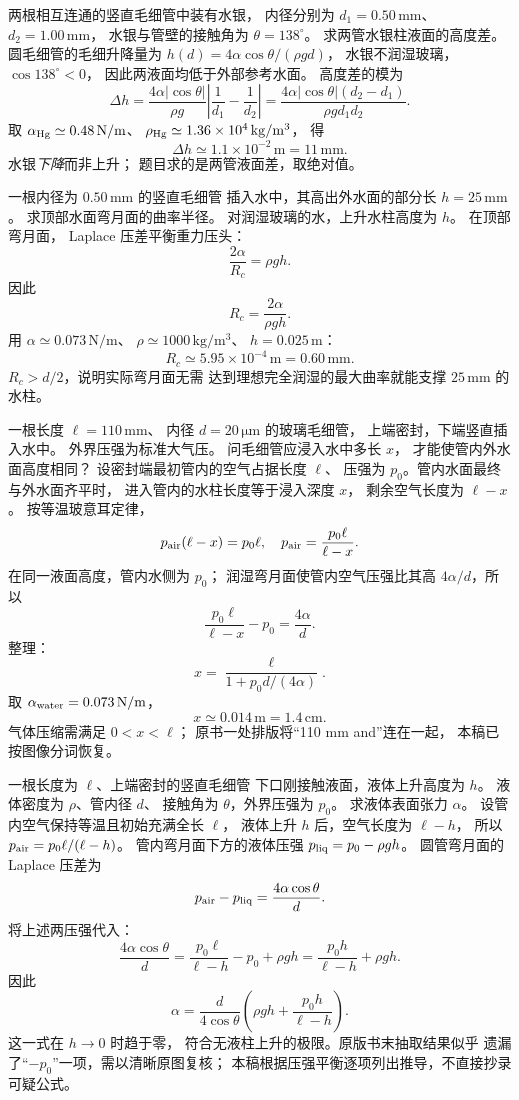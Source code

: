 两根相互连通的竖直毛细管中装有水银，
内径分别为
$d_1=0.50\,\mathrm{mm}$、
$d_2=1.00\,\mathrm{mm}$，
水银与管壁的接触角为
$\theta=138^\circ$。
求两管水银柱液面的高度差。
\exsolution
圆毛细管的毛细升降量为
$h(d)=4\alpha\cos\theta/(\rho gd)$，
水银不润湿玻璃，$\cos138^\circ<0$，
因此两液面均低于外部参考水面。
高度差的模为
\[
\boxed{\Delta h=
\frac{4\alpha|\cos\theta|}{\rho g}
\left|\frac1{d_1}-\frac1{d_2}\right|
=\frac{4\alpha|\cos\theta|(d_2-d_1)}
{\rho gd_1d_2}}.
\]
取 $\alpha_{\rm Hg}\simeq0.48\,\mathrm{N/m}$、
$\rho_{\rm Hg}\simeq1.36\times10^4\,\mathrm{kg/m^3}$，
得
\[
\boxed{\Delta h\simeq1.1\times10^{-2}\,\mathrm m
=11\,\mathrm{mm}}.
\]
\excheck 水银\emph{下降}而非上升；
题目求的是两管液面差，取绝对值。

一根内径为 $0.50\,\mathrm{mm}$ 的竖直毛细管
插入水中，其高出外水面的部分长
$h=25\,\mathrm{mm}$。
求顶部水面弯月面的曲率半径。
\exsolution
对润湿玻璃的水，上升水柱高度为 $h$。
在顶部弯月面，
Laplace 压差平衡重力压头：
\[
\frac{2\alpha}{R_c}=\rho gh.
\]
因此
\[
\boxed{R_c=\frac{2\alpha}{\rho gh}}.
\]
用 $\alpha\simeq0.073\,\mathrm{N/m}$、
$\rho\simeq1000\,\mathrm{kg/m^3}$、
$h=0.025\,\mathrm m$：
\[
\boxed{R_c\simeq5.95\times10^{-4}\,\mathrm m
=0.60\,\mathrm{mm}}.
\]
\excheck $R_c>d/2$，说明实际弯月面无需
达到理想完全润湿的最大曲率就能支撑
$25\,\mathrm{mm}$ 的水柱。

一根长度 $\ell=110\,\mathrm{mm}$、
内径 $d=20\,\mathrm{\mu m}$ 的玻璃毛细管，
上端密封，下端竖直插入水中。
外界压强为标准大气压。
问毛细管应浸入水中多长 $x$，
才能使管内外水面高度相同？
\exsolution
设密封端最初管内的空气占据长度 $\ell$、
压强为 $p_0$。管内水面最终与外水面齐平时，
进入管内的水柱长度等于浸入深度 $x$，
剩余空气长度为 $\ell-x$。
按等温玻意耳定律，
\[
p_{\rm air}(\ell-x)=p_0\ell,
\quad p_{\rm air}=\frac{p_0\ell}{\ell-x}.
\]
在同一液面高度，管内水侧为 $p_0$；
润湿弯月面使管内空气压强比其高
$4\alpha/d$，所以
\[
\frac{p_0\ell}{\ell-x}-p_0=\frac{4\alpha}{d}.
\]
整理：
\[
\boxed{x=\frac{\ell}{1+p_0d/(4\alpha)}}.
\]
取 $\alpha_{\rm water}=0.073\,\mathrm{N/m}$，
\[
\boxed{x\simeq0.014\,\mathrm m=1.4\,\mathrm{cm}}.
\]
\excheck 气体压缩需满足 $0<x<\ell$；
原书一处排版将“110 mm and”连在一起，
本稿已按图像分词恢复。

一根长度为 $\ell$、上端密封的竖直毛细管
下口刚接触液面，液体上升高度为 $h$。
液体密度为 $\rho$、管内径 $d$、
接触角为 $\theta$，外界压强为 $p_0$。
求液体表面张力 $\alpha$。
\exsolution
设管内空气保持等温且初始充满全长 $\ell$，
液体上升 $h$ 后，空气长度为 $\ell-h$，
所以
$p_{\rm air}=p_0\ell/(\ell-h)$。
管内弯月面下方的液体压强
$p_{\rm liq}=p_0-\rho gh$。
圆管弯月面的 Laplace 压差为
\[
p_{\rm air}-p_{\rm liq}
=\frac{4\alpha\cos\theta}{d}.
\]
将上述两压强代入：
\[
\frac{4\alpha\cos\theta}{d}
=\frac{p_0\ell}{\ell-h}-p_0+\rho gh
=\frac{p_0h}{\ell-h}+\rho gh.
\]
因此
\[
\boxed{\alpha=
\frac d{4\cos\theta}
\left(\rho gh+\frac{p_0h}{\ell-h}\right)}.
\]
\excheck 这一式在 $h\to0$ 时趋于零，
符合无液柱上升的极限。原版书末抽取结果似乎
遗漏了“$-p_0$”一项，需以清晰原图复核；
本稿根据压强平衡逐项列出推导，不直接抄录可疑公式。

